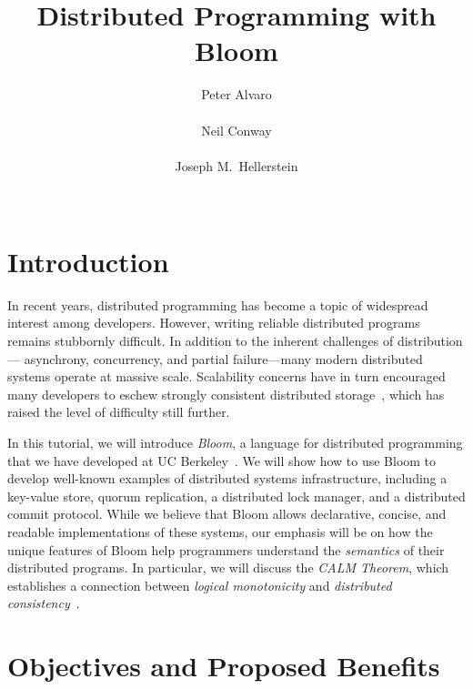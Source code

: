 \documentclass{sig-alternate}
\begin{document}
\title{Distributed Programming with Bloom}

\author{
\alignauthor
Peter Alvaro\\
        \\
\alignauthor
Neil Conway\\
        \\
\alignauthor
Joseph M.\ Hellerstein\\
        \\
}

\maketitle

\section{Introduction}

In recent years, distributed programming has become a topic of widespread
interest among developers. However, writing reliable distributed programs
remains stubbornly difficult. In addition to the inherent challenges of
distribution--- asynchrony, concurrency, and partial failure---many modern
distributed systems operate at massive scale. Scalability concerns have in turn
encouraged many developers to eschew strongly consistent distributed
storage~\cite{Birman2009,Helland2009}, which has raised the level of difficulty
still further.

In this tutorial, we will introduce \emph{Bloom}, a language for distributed
programming that we have developed at UC Berkeley~\cite{bloom-website}. We will
show how to use Bloom to develop well-known examples of distributed systems
infrastructure, including a key-value store, quorum replication, a distributed
lock manager, and a distributed commit protocol. While we believe that Bloom
allows declarative, concise, and readable implementations of these systems, our
emphasis will be on how the unique features of Bloom help programmers understand
the \emph{semantics} of their distributed programs. In particular, we will
discuss the \emph{CALM Theorem}, which establishes a connection between
\emph{logical monotonicity} and \emph{distributed
  consistency}~\cite{Alvaro2011,Ameloot2011,Hellerstein2010,dedalus-confluence}.

\section{Objectives and Proposed Benefits}
\end{document}

